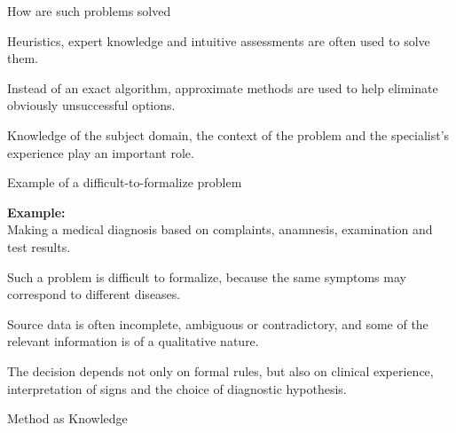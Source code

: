 \begin{frame}{How are such problems solved}
	\topline
	\justifying
	
	\begin{textitemize}
		\item Heuristics, expert knowledge and intuitive assessments are often used to solve them.
		\item Instead of an exact algorithm, approximate methods are used to help eliminate obviously unsuccessful options.
		\item Knowledge of the subject domain, the context of the problem and the specialist’s experience play an important role.
	\end{textitemize}
\end{frame}

\begin{frame}{Example of a difficult-to-formalize problem}
	\topline
	\justifying
	
	\vspace{10mm}
	
	\textbf{Example:}\\ Making a medical diagnosis based on complaints, anamnesis, examination and test results.
	
	\vspace{10mm}
	
	\begin{textitemize}
		\item Such a problem is difficult to formalize, because the same symptoms may correspond to different diseases.
		\item Source data is often incomplete, ambiguous or contradictory, and some of the relevant information is of a qualitative nature.
		\item The decision depends not only on formal rules, but also on clinical experience, interpretation of signs and the choice of diagnostic hypothesis.
	\end{textitemize}
\end{frame}

\begin{frame}{Method as Knowledge}
	\topline
	\justifying
	
	\vspace{10mm}
	
	\begin{SCn}
	\end{SCn}
\end{frame}


